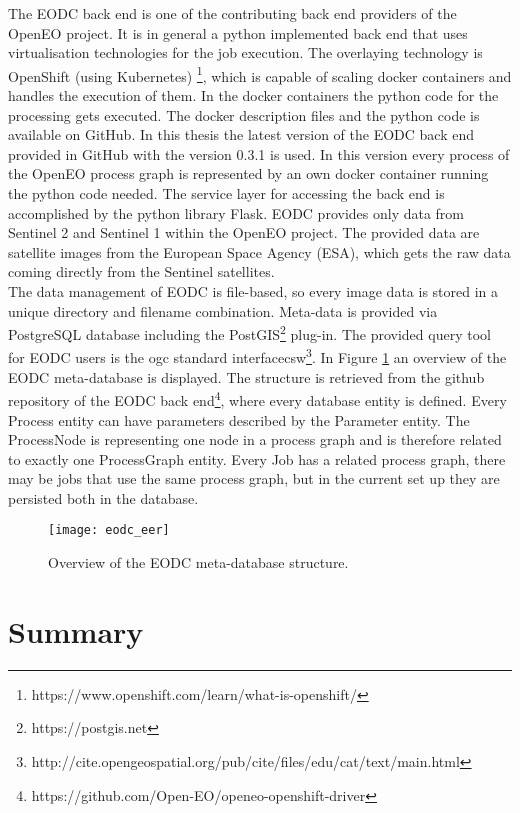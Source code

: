\documentclass[draft,final]{vutinfth} %
\begin{document}
The EODC back end is one of the contributing back end providers of the OpenEO project. It is in general a python implemented back end that uses virtualisation technologies for the job execution. The overlaying technology is OpenShift (using Kubernetes) \footnote{https://www.openshift.com/learn/what-is-openshift/}, which is capable of scaling docker containers and handles the execution of them. In the docker containers the python code for the processing gets executed. The docker description files and the python code is available on GitHub. In this thesis the latest version of the EODC back end provided in GitHub with the version 0.3.1 is used. In this version every process of the OpenEO process graph is represented by an own docker container running the python code needed. The service layer for accessing the back end is accomplished by the python library Flask. EODC provides only data from Sentinel 2 and Sentinel 1 within the OpenEO project. The provided data are satellite images from the European Space Agency (ESA), which gets the raw data coming directly from the Sentinel satellites. \\
The data management of EODC is file-based, so every image data is stored in a unique directory and filename combination. Meta-data is provided via PostgreSQL database including the PostGIS\footnote{https://postgis.net} plug-in. The provided query tool for EODC users is the \gls{ogc} standard interface\gls{csw}\footnote{http://cite.opengeospatial.org/pub/cite/files/edu/cat/text/main.html}. In Figure \ref{fig:eodceer} an overview of the EODC meta-database is displayed. The structure is retrieved from the github repository of the EODC back end\footnote{https://github.com/Open-EO/openeo-openshift-driver}, where every database entity is defined. Every Process entity can have parameters described by the Parameter entity. The ProcessNode is representing one node in a process graph and is therefore related to exactly one ProcessGraph entity. Every Job has a related process graph, there may be jobs that use the same process graph, but in the current set up they are persisted both in the database.

\begin{figure}[h]
	\centering
	\texttt{[image: eodc\_eer]}
	\caption{Overview of the EODC meta-database structure.}
	\label{fig:eodceer} %
\end{figure}

\section{Summary}
\end{document}
